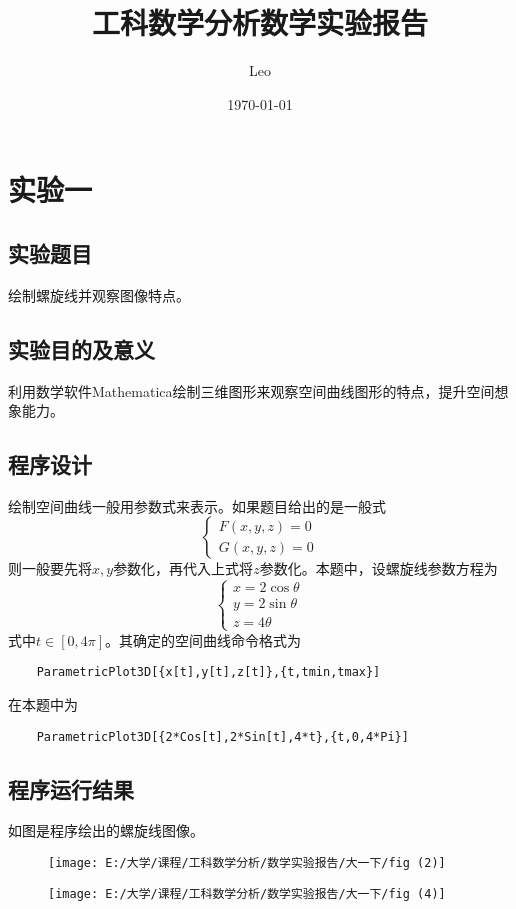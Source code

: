 \documentclass{ctexart}
\title{工科数学分析数学实验报告}
\author{Leo}
\date{\today}
\begin{document}
	\newcommand\dif{\mathrm{d}}
	\maketitle 
	\section{实验一}
	\subsection{实验题目}
	绘制螺旋线并观察图像特点。
	\subsection{实验目的及意义}
	利用数学软件Mathematica绘制三维图形来观察空间曲线图形的特点，提升空间想象能力。
	\subsection{程序设计}
	绘制空间曲线一般用参数式来表示。如果题目给出的是一般式
	\begin{equation}\label{key}
		\begin{cases}
			F(x,y,z)=0\\
			G(x,y,z)=0
		\end{cases}
	\end{equation}
则一般要先将$x,y$参数化，再代入上式将$z$参数化。本题中，设螺旋线参数方程为
\begin{equation}\label{key}
	\begin{cases}
		x=2\cos \theta\\
		y=2\sin \theta \\
		z= 4\theta
	\end{cases}
\end{equation}
式中$t \in [0,4\pi]$。其确定的空间曲线命令格式为
\begin{lstlisting}
	ParametricPlot3D[{x[t],y[t],z[t]},{t,tmin,tmax}]
\end{lstlisting}
在本题中为
\begin{lstlisting}
	ParametricPlot3D[{2*Cos[t],2*Sin[t],4*t},{t,0,4*Pi}]
\end{lstlisting}
\subsection{程序运行结果}
	如图是程序绘出的螺旋线图像。
\begin{figure}
	\centering
	\texttt{[image: E:/大学/课程/工科数学分析/数学实验报告/大一下/fig (2)]}
	
	\texttt{[image: E:/大学/课程/工科数学分析/数学实验报告/大一下/fig (4)]}
\end{figure}
\newpage
\end{document}
